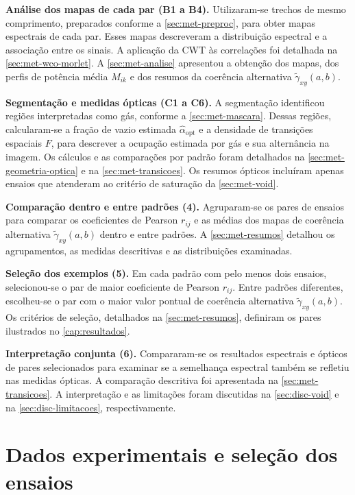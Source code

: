 \textbf{Análise dos mapas de cada par (B1 a B4).} Utilizaram-se trechos de
mesmo comprimento, preparados conforme a \autoref{sec:met-preproc}, para
obter mapas espectrais de cada par. Esses mapas descreveram a distribuição
espectral e a associação entre os sinais. A aplicação da CWT às
correlações foi detalhada na \autoref{sec:met-wco-morlet}. A
\autoref{sec:met-analise} apresentou a obtenção dos mapas, dos perfis de
potência média $M_{ik}$ e dos resumos da coerência alternativa
$\widetilde\gamma_{xy}(a,b)$.

\textbf{Segmentação e medidas ópticas (C1 a C6).} A segmentação
identificou regiões interpretadas como gás, conforme a
\autoref{sec:met-mascara}. Dessas regiões, calcularam-se a fração de vazio
estimada $\widehat\alpha_{\mathrm{opt}}$ e a densidade de transições
espaciais $F$, para descrever a ocupação estimada por gás e sua alternância
na imagem. Os cálculos e as comparações por padrão foram detalhados na
\autoref{sec:met-geometria-optica} e na \autoref{sec:met-transicoes}.
Os resumos ópticos incluíram apenas ensaios que atenderam ao critério
de saturação da \autoref{sec:met-void}.

\textbf{Comparação dentro e entre padrões (4).} Agruparam-se os pares de
ensaios para comparar os coeficientes de Pearson $r_{ij}$ e as médias dos
mapas de coerência alternativa $\widetilde\gamma_{xy}(a,b)$ dentro e entre
padrões. A \autoref{sec:met-resumos} detalhou os agrupamentos, as medidas
descritivas e as distribuições examinadas.

\textbf{Seleção dos exemplos (5).} Em cada padrão com pelo menos dois
ensaios, selecionou-se o par de maior coeficiente de Pearson $r_{ij}$.
Entre padrões diferentes, escolheu-se o par com o maior valor pontual de
coerência alternativa $\widetilde\gamma_{xy}(a,b)$. Os critérios de
seleção, detalhados na \autoref{sec:met-resumos}, definiram os pares
ilustrados no \autoref{cap:resultados}.

\textbf{Interpretação conjunta (6).} Compararam-se os resultados
espectrais e ópticos de pares selecionados para examinar se a semelhança
espectral também se refletiu nas medidas ópticas. A comparação descritiva
foi apresentada na \autoref{sec:met-transicoes}. A interpretação e as
limitações foram discutidas na \autoref{sec:disc-void} e na
\autoref{sec:disc-limitacoes}, respectivamente.

\section{Dados experimentais e seleção dos ensaios}\label{sec:met-dados}

